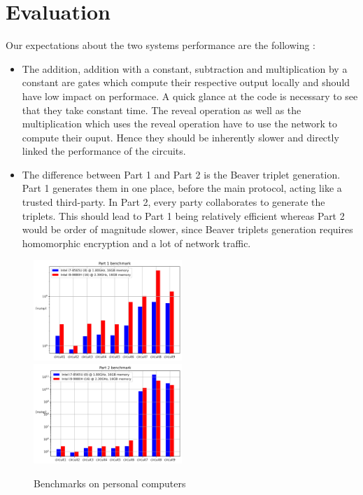 \documentclass[10pt,conference]{IEEEtran}
\begin{document}
\section{Evaluation}
Our expectations about the two systems performance are the following :
\begin{itemize}
    \item The addition, addition with a constant, subtraction and multiplication by a constant are gates which compute their respective output locally and should have low impact on performace. A quick glance at the code is necessary to see that they take constant time. The reveal operation as well as the multiplication which uses the reveal operation have to use the network to compute their ouput. Hence they should be inherently slower and directly linked the performance of the circuits.
    \item The difference between Part 1 and Part 2 is the Beaver triplet generation. Part 1 generates them in one place, before the main protocol, acting like a trusted third-party. In Part 2, every party collaborates to generate the triplets. This should lead to Part 1 being relatively efficient whereas Part 2 would be order of magnitude slower, since Beaver triplets generation requires homomorphic encryption and a lot of network traffic.
\end{itemize}
\begin{figure}[h]
  \caption{Benchmarks on personal computers}
  \label{fig:bench}
  \includegraphics[width=0.5\textwidth]{Part_1_benchmark.png}
  \includegraphics[width=0.5\textwidth]{Part_2_benchmark.png}
\end{figure}
\end{document}
